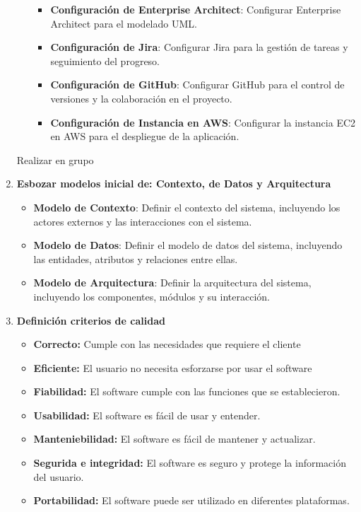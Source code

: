 \begin{doublespace}
\begin{enumerate}[label=\alph*)]
\begin{enumerate}
\begin{itemize}
            \item \textbf{Configuración de Enterprise Architect}: Configurar Enterprise Architect para el modelado UML.
            \item \textbf{Configuración de Jira}: Configurar Jira para la gestión de tareas y seguimiento del progreso.
            \item \textbf{Configuración de GitHub}: Configurar GitHub para el control de versiones y la colaboración en el proyecto.
            \item \textbf{Configuración de Instancia en AWS}: Configurar la instancia EC2 en AWS para el despliegue de la aplicación.
        \end{itemize}

    \end{enumerate}

\newpage
    Realizar en grupo
    \item \large\textbf{Esbozar modelos inicial de: Contexto, de Datos y Arquitectura}
        \begin{itemize}
            \item \textbf{Modelo de Contexto}: Definir el contexto del sistema, incluyendo los actores externos y las interacciones con el sistema.
            \item \textbf{Modelo de Datos}: Definir el modelo de datos del sistema, incluyendo las entidades, atributos y relaciones entre ellas.
            \item \textbf{Modelo de Arquitectura}: Definir la arquitectura del sistema, incluyendo los componentes, módulos y su interacción.
        \end{itemize}

    \item \large\textbf{Definición criterios de calidad}
    \begin{itemize}
        
        \item \textbf{Correcto:} Cumple con las necesidades que requiere el cliente\par
        \item \textbf{Eficiente:} El usuario no necesita esforzarse por usar el software
        \item \textbf{Fiabilidad:} El software cumple con las funciones que se establecieron.
        \item \textbf{Usabilidad:} El software es fácil de usar y entender.
        \item \textbf{Manteniebilidad:} El software es fácil de mantener y actualizar.
        \item \textbf{Segurida e integridad:} El software es seguro y protege la información del usuario.
        \item \textbf{Portabilidad:} El software puede ser utilizado en diferentes plataformas.


\end{itemize}
\end{enumerate}
\end{doublespace}
